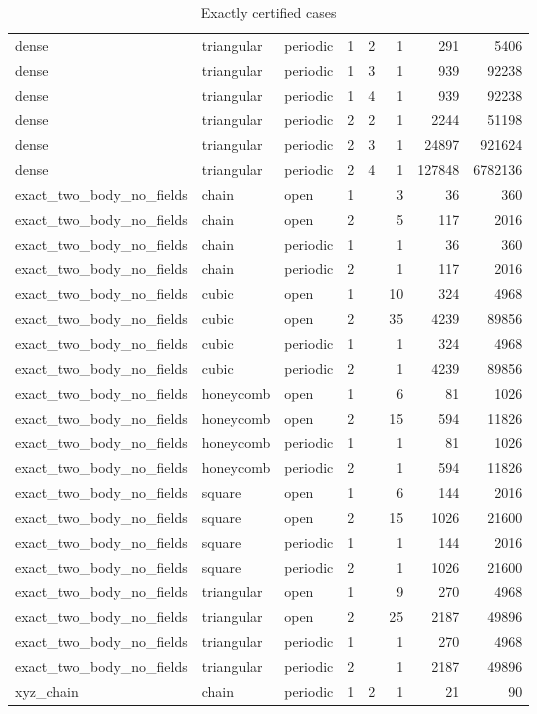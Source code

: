 \begin{table}
\begin{tabular}{llllrrrr}
dense & triangular & periodic & 1 & 2 & 1 & 291 & 5406 \\
dense & triangular & periodic & 1 & 3 & 1 & 939 & 92238 \\
dense & triangular & periodic & 1 & 4 & 1 & 939 & 92238 \\
dense & triangular & periodic & 2 & 2 & 1 & 2244 & 51198 \\
dense & triangular & periodic & 2 & 3 & 1 & 24897 & 921624 \\
dense & triangular & periodic & 2 & 4 & 1 & 127848 & 6782136 \\
exact\_two\_body\_no\_fields & chain & open & 1 &  & 3 & 36 & 360 \\
exact\_two\_body\_no\_fields & chain & open & 2 &  & 5 & 117 & 2016 \\
exact\_two\_body\_no\_fields & chain & periodic & 1 &  & 1 & 36 & 360 \\
exact\_two\_body\_no\_fields & chain & periodic & 2 &  & 1 & 117 & 2016 \\
exact\_two\_body\_no\_fields & cubic & open & 1 &  & 10 & 324 & 4968 \\
exact\_two\_body\_no\_fields & cubic & open & 2 &  & 35 & 4239 & 89856 \\
exact\_two\_body\_no\_fields & cubic & periodic & 1 &  & 1 & 324 & 4968 \\
exact\_two\_body\_no\_fields & cubic & periodic & 2 &  & 1 & 4239 & 89856 \\
exact\_two\_body\_no\_fields & honeycomb & open & 1 &  & 6 & 81 & 1026 \\
exact\_two\_body\_no\_fields & honeycomb & open & 2 &  & 15 & 594 & 11826 \\
exact\_two\_body\_no\_fields & honeycomb & periodic & 1 &  & 1 & 81 & 1026 \\
exact\_two\_body\_no\_fields & honeycomb & periodic & 2 &  & 1 & 594 & 11826 \\
exact\_two\_body\_no\_fields & square & open & 1 &  & 6 & 144 & 2016 \\
exact\_two\_body\_no\_fields & square & open & 2 &  & 15 & 1026 & 21600 \\
exact\_two\_body\_no\_fields & square & periodic & 1 &  & 1 & 144 & 2016 \\
exact\_two\_body\_no\_fields & square & periodic & 2 &  & 1 & 1026 & 21600 \\
exact\_two\_body\_no\_fields & triangular & open & 1 &  & 9 & 270 & 4968 \\
exact\_two\_body\_no\_fields & triangular & open & 2 &  & 25 & 2187 & 49896 \\
exact\_two\_body\_no\_fields & triangular & periodic & 1 &  & 1 & 270 & 4968 \\
exact\_two\_body\_no\_fields & triangular & periodic & 2 &  & 1 & 2187 & 49896 \\
xyz\_chain & chain & periodic & 1 & 2 & 1 & 21 & 90 \\
\end{tabular}
\caption{Exactly certified cases}
\end{table}

